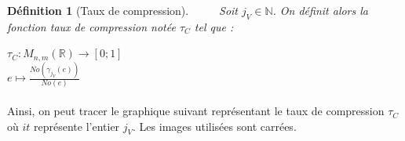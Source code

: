 \documentclass[a4paper,10pt]{report}
\theoremstyle{break}
\newtheorem{Def}{D\'{e}finition}
\begin{document}
\newpage
  
    \begin{Def}[Taux de compression]
      $\phantom{Prop}$ Soit $j_V \in \mathbb{N}$. On d\'{e}finit alors la fonction taux de compression not\'{e}e $\tau_C$ tel que :
      
      \begin{center}
	$ \tau_C :  M_{n,m}(\mathbb{R}) \longrightarrow [0;1] $ \\
	$ e \longmapsto \frac{No(\gamma_{j_V}(e))}{No(e)} $
      \end{center}

    \end{Def}
    
    \paragraph{} Ainsi, on peut tracer le graphique suivant repr\'{e}sentant le taux de compression $\tau_C$ 
	o\`{u} $it$ repr\'{e}sente l'entier $j_V$. Les images utilis\'{e}es sont carr\'{e}es.
\end{document}
